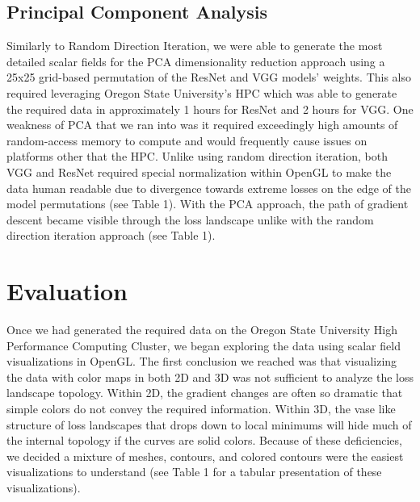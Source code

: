 \documentclass{acmsiggraph}
\begin{document}
\subsection{Principal Component Analysis}

Similarly to Random Direction Iteration, we were able to generate the most detailed scalar fields for the PCA dimensionality reduction approach using a 25x25 grid-based permutation of the ResNet and VGG models' weights. This also required leveraging Oregon State University's HPC which was able to generate the required data in approximately 1 hours for ResNet and 2 hours for VGG. One weakness of PCA that we ran into was it required exceedingly high amounts of random-access memory to compute and would frequently cause issues on platforms other that the HPC. Unlike using random direction iteration, both VGG and ResNet required special normalization within OpenGL to make the data human readable due to divergence towards extreme losses on the edge of the model permutations (see Table 1). With the PCA approach, the path of gradient descent became visible through the loss landscape unlike with the random direction iteration approach (see Table 1).

\section{Evaluation}
\label{sec:intro}

Once we had generated the required data on the Oregon State University High Performance Computing Cluster, we began exploring the data using scalar field visualizations in OpenGL. The first conclusion we reached was that visualizing the data with color maps in both 2D and 3D was not sufficient to analyze the loss landscape topology. Within 2D, the gradient changes are often so dramatic that simple colors do not convey the required information. Within 3D, the vase like structure of loss landscapes that drops down to local minimums will hide much of the internal topology if the curves are solid colors. Because of these deficiencies, we decided a mixture of meshes, contours, and colored contours were the easiest visualizations to understand (see Table 1 for a tabular presentation of these visualizations). 
\end{document}
